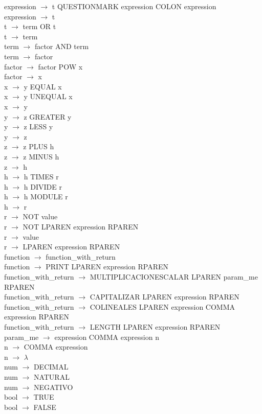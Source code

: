 \documentclass[10pt,a4paper]{article}
\begin{document}
expression $\rightarrow$ t QUESTIONMARK expression COLON expression \\
expression $\rightarrow$ t \\
t $\rightarrow$ term OR t \\
t $\rightarrow$ term \\
term $\rightarrow$ factor AND term \\
term $\rightarrow$ factor \\
factor $\rightarrow$ factor POW x \\
factor $\rightarrow$ x \\
x $\rightarrow$ y EQUAL x \\
x $\rightarrow$ y UNEQUAL x \\
x $\rightarrow$ y \\
y $\rightarrow$ z GREATER y \\
y $\rightarrow$ z LESS y \\
y $\rightarrow$ z \\
z $\rightarrow$ z PLUS h \\
z $\rightarrow$ z MINUS h \\
z $\rightarrow$ h \\
h $\rightarrow$ h TIMES r \\
h $\rightarrow$ h DIVIDE r \\
h $\rightarrow$ h MODULE r \\
h $\rightarrow$ r \\
r $\rightarrow$ NOT value \\
r $\rightarrow$ NOT LPAREN expression RPAREN \\
r $\rightarrow$ value \\
r $\rightarrow$ LPAREN expression RPAREN \\
function $\rightarrow$ function\_with\_return \\
function $\rightarrow$ PRINT LPAREN expression RPAREN \\
function\_with\_return $\rightarrow$ MULTIPLICACIONESCALAR LPAREN param\_me RPAREN \\
function\_with\_return $\rightarrow$ CAPITALIZAR LPAREN expression RPAREN \\
function\_with\_return $\rightarrow$ COLINEALES LPAREN expression COMMA expression RPAREN \\
function\_with\_return $\rightarrow$ LENGTH LPAREN expression RPAREN \\
param\_me $\rightarrow$ expression COMMA expression n \\
n $\rightarrow$ COMMA expression \\
n $\rightarrow$ $\lambda$ \\
num $\rightarrow$ DECIMAL \\
num $\rightarrow$ NATURAL \\
num $\rightarrow$ NEGATIVO \\
bool $\rightarrow$ TRUE \\
bool $\rightarrow$ FALSE \\
\end{document}
